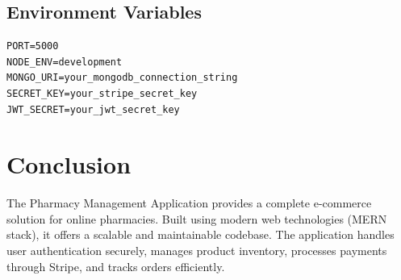 \documentclass[12pt,a4paper]{article}
\begin{document}
\subsection{Environment Variables}
\begin{verbatim}
PORT=5000
NODE_ENV=development
MONGO_URI=your_mongodb_connection_string
SECRET_KEY=your_stripe_secret_key
JWT_SECRET=your_jwt_secret_key
\end{verbatim}

\section{Conclusion}

The Pharmacy Management Application provides a complete e-commerce solution for online pharmacies. Built using modern web technologies (MERN stack), it offers a scalable and maintainable codebase. The application handles user authentication securely, manages product inventory, processes payments through Stripe, and tracks orders efficiently.
\end{document}
